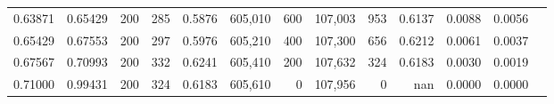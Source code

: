 \begin{tabular}{rrrrrrrrrrrrr}
0.63871 & 0.65429 &   200 & 285 &                                     0.5876 & 605,010 &     600 & 107,003 &     953 & 0.6137 & 0.0088 & 0.0056 \\
0.65429 & 0.67553 &   200 & 297 &                                     0.5976 & 605,210 &     400 & 107,300 &     656 & 0.6212 & 0.0061 & 0.0037 \\
0.67567 & 0.70993 &   200 & 332 &                                     0.6241 & 605,410 &     200 & 107,632 &     324 & 0.6183 & 0.0030 & 0.0019 \\
0.71000 & 0.99431 &   200 & 324 &                                     0.6183 & 605,610 &       0 & 107,956 &       0 &    nan & 0.0000 & 0.0000 \\
\bottomrule
\end{tabular}
